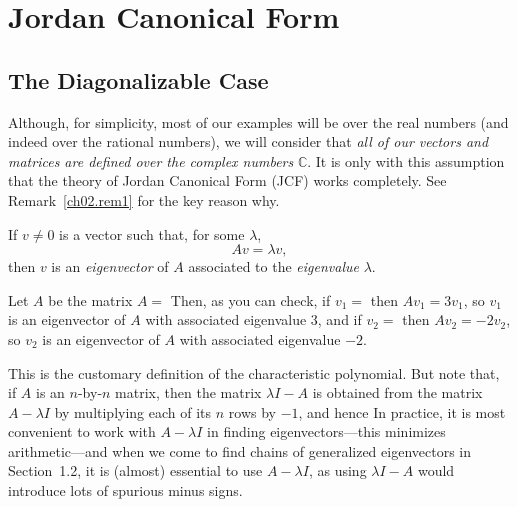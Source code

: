 

\chapter{Jordan Canonical Form}
\label{ch02}
%

\section{The Diagonalizable Case}

Although, for simplicity, most of our examples
will be over the real numbers
(and indeed over the rational numbers), we will consider that
\textit{all of our vectors and matrices
are defined over the complex numbers} $\mathbb{C}$.
It is only with this assumption that the
theory of Jordan Canonical Form (JCF) works
%
completely.
See Remark~\ref{ch02.rem1} for the key reason why.

\begin{definition}
\label{ch02.def1}
If \(v \neq 0\) is a vector such that, for some
$\lambda$,
\[
A v = \lambda v,
\]
then $v$ is an \textit{eigenvector} of $A$ associated
%
to the \textit{eigenvalue} $\lambda$.
%
\end{definition}

\begin{example}
\label{ch02.ex1}
Let $A$ be the matrix $A =$
Then, as you can check, if $v_1 =$ 
then $A v_1 = 3 v_1$, so $v_1$ is an eigenvector of $A$ with associated
eigenvalue $3$, and if $v_2 =$ 
then $A v_2 = -2 v_2$, so $v_2$ is
an eigenvector of $A$ with associated eigenvalue $-2$.
\end{example}

\begin{remark}
\label{ch02.rem1}
This is the customary definition of the characteristic
%
polynomial.
But note that, if $A$ is an $n$-by-$n$ matrix, then the matrix
$\lambda I - A$ is obtained from the matrix $A - \lambda I$ by multiplying
each of its $n$ rows by $-1$, and hence
In practice, it is most convenient
to work with $A -\lambda I$ in finding eigenvectors---this minimizes
arithmetic---and when we come to find
chains of generalized eigenvectors in
Section~1.2,
it is (almost) essential to use $A -\lambda I$, as using
$\lambda I - A$ would introduce lots of spurious minus signs.
\end{remark}

\clearpage

